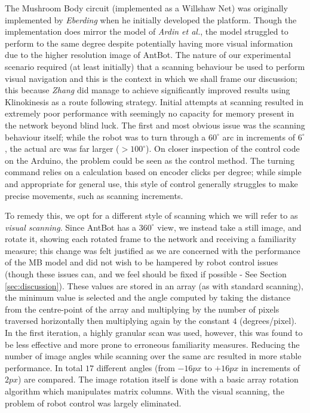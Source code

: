 \documentclass[a4paper,12pt]{article}
\begin{document}
The Mushroom Body circuit (implemented as a Willshaw Net) was originally implemented by \textit{Eberding} when he
initially developed the platform. Though the implementation does mirror the model of \textit{Ardin et al.}, the model
struggled to perform to the same degree despite potentially having more visual information due to the higher resolution
image of AntBot. The nature of our experimental scenario required (at least initially) that a scanning behaviour be used
to perform visual navigation and this is the context in which we shall frame our discussion; this because \textit{Zhang}
did manage to achieve significantly improved results using Klinokinesis as a route following strategy. Initial attempts
at scanning resulted in extremely poor performance with seemingly no capacity for memory present in the network beyond
blind luck. The first and most obvious issue was the scanning behaviour itself; while the robot was to turn through a
$60^{\circ}$ arc in increments of $6^{\circ}$, the actual arc was far larger ($> 100^{\circ}$). On closer inspection of the
control code on the Arduino, the problem could be seen as the control method. The turning command relies on a calculation
based on encoder clicks per degree; while simple and appropriate for general use, this style of control generally struggles
to make precise movements, such as scanning increments.
\newline

To remedy this, we opt for a different style of scanning which
we will refer to as \textit{visual scanning}. Since AntBot has a $360^{\circ}$ view, we instead take a still image, and rotate
it, showing each rotated frame to the network and receiving a familiarity measure; this change was felt justified as we are
concerned with the performance of the MB model and did not wish to be hampered by robot control issues (though these issues
can, and we feel should be fixed if possible - See Section \ref{sec:discussion}). These values are stored in an array (as
with standard scanning), the minimum value is selected and the angle computed by taking the distance from the centre-point
of the array and multiplying by the number of pixels traversed horizontally then multiplying again by the constant $4$ (degrees/pixel).
In the first iteration, a highly granular scan was used, however, this was found to be less effective and more prone to erroneous
familiarity measures. Reducing the number of image angles while scanning over the same arc resulted in more stable performance. In total
$17$ different angles (from $-16px$ to $+16px$ in increments of $2px$) are compared. The image rotation itself is done with
a basic array rotation algorithm which manipulates matrix columns. With the visual scanning, the problem of robot
control was largely eliminated. 
\newline
\end{document}
